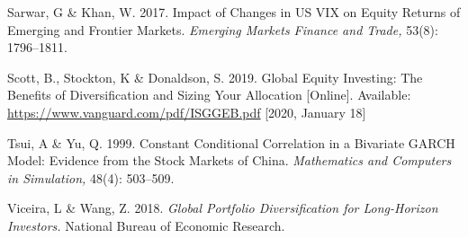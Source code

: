 \documentclass[11pt,preprint, authoryear]{elsarticle}
\numberwithin{equation}{section}
\numberwithin{figure}{section}
\numberwithin{table}{section}
\begin{document}
\leavevmode\hypertarget{ref-sarwarimpact}{}%
Sarwar, G \& Khan, W. 2017. Impact of Changes in US VIX on
Equity Returns of Emerging and Frontier Markets. \emph{Emerging Markets
Finance and Trade,} 53(8): 1796--1811.

\leavevmode\hypertarget{ref-scott2019global}{}%
Scott, B., Stockton, K \& Donaldson, S. 2019. Global Equity
Investing: The Benefits of Diversification and Sizing Your Allocation [Online].
Available: \url{https://www.vanguard.com/pdf/ISGGEB.pdf} [2020, January 18]

\leavevmode\hypertarget{ref-tsui1999constant}{}%
Tsui, A \& Yu, Q. 1999. Constant Conditional Correlation in
a Bivariate GARCH Model: Evidence from the Stock Markets of China.
\emph{Mathematics and Computers in Simulation,} 48(4): 503--509.

\leavevmode\hypertarget{ref-viceira2018global}{}%
Viceira, L \& Wang, Z. 2018. \emph{Global Portfolio
Diversification for Long-Horizon Investors.} National Bureau of
Economic Research.




\end{document}

